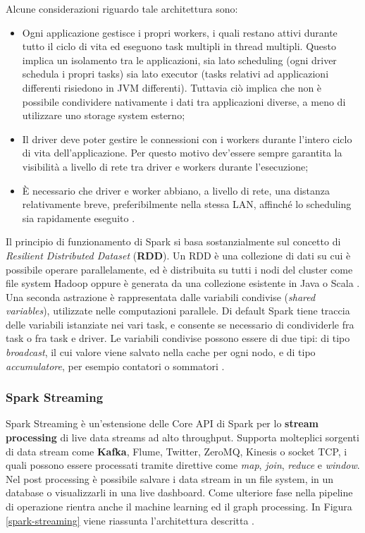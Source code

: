 \documentclass[11pt]{article}
\begin{document}
Alcune considerazioni riguardo tale architettura sono: 
\begin{itemize}
	\item Ogni applicazione gestisce i propri workers, i quali restano attivi durante tutto il ciclo di vita ed eseguono task multipli in thread multipli. Questo implica un isolamento tra le applicazioni, sia lato scheduling (ogni driver schedula i propri tasks) sia lato executor (tasks relativi ad applicazioni differenti risiedono in JVM differenti). Tuttavia ciò implica che non è possibile condividere nativamente i dati tra applicazioni diverse, a meno di utilizzare uno storage system esterno;
	\item Il driver deve poter gestire le connessioni con i workers durante l'intero ciclo di vita dell'applicazione. Per questo motivo dev'essere sempre garantita la visibilità a livello di rete tra driver e workers durante l'esecuzione;
	\item \`E necessario che driver e worker abbiano, a livello di rete, una distanza relativamente breve, preferibilmente nella stessa LAN, affinché lo scheduling sia rapidamente eseguito \cite{spark}. 
\end{itemize}

Il principio di funzionamento di Spark si basa sostanzialmente sul concetto di \textit{Resilient Distributed Dataset} (\textbf{RDD}). Un RDD è una collezione di dati su cui è possibile operare parallelamente, ed è distribuita su tutti i nodi del cluster come file system Hadoop oppure è generata da una collezione esistente in Java o Scala \cite{spark}. \\

Una seconda astrazione è rappresentata dalle variabili condivise (\textit{shared variables}), utilizzate nelle computazioni parallele. Di default Spark tiene traccia delle variabili istanziate nei vari task, e consente se necessario di condividerle fra task o fra task e driver. Le variabili condivise possono essere di due tipi: di tipo \textit{broadcast}, il cui valore viene salvato nella cache per ogni nodo, e di tipo \textit{accumulatore}, per esempio contatori o sommatori \cite{spark}.

\subsubsection{Spark Streaming}

Spark Streaming è un'estensione delle Core API di Spark per lo\textbf{ stream processing} di live data streams ad alto throughput. Supporta molteplici sorgenti di data stream come\textbf{ Kafka}, Flume, Twitter, ZeroMQ, Kinesis o socket TCP, i quali possono essere processati tramite direttive come \textit{map}, \textit{join}, \textit{reduce} e \textit{window}. Nel post processing è possibile salvare i data stream in un file system, in un database o visualizzarli in una live dashboard. Come ulteriore fase nella pipeline di operazione rientra anche il machine learning ed il graph processing. In Figura \ref{spark-streaming} viene riassunta l'architettura descritta \cite{spark}. 
\end{document}
